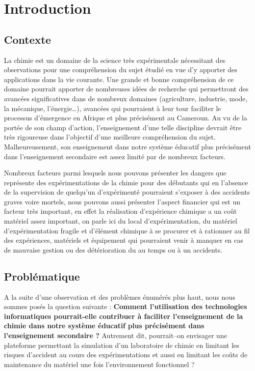 \chapter*{Introduction}         %

\section*{Contexte}

La chimie est un domaine de la science très expérimentale nécessitant des observations pour une compréhension du sujet étudié en vue d’y apporter des applications dans la vie courante. Une grande et bonne compréhension de ce domaine pourrait apporter de nombreuses idées de recherche qui permettront des avancées significatives dans de nombreux domaines (agriculture, industrie, mode, la mécanique, l'énergie…), avancées qui pourraient à leur tour faciliter le processus d'émergence en Afrique et plus précisément au Cameroun. Au vu de la portée de son champ d’action, l'enseignement d’une telle discipline devrait être très rigoureuse dans l’objectif d’une meilleure compréhension du sujet. Malheureusement, son enseignement dans notre système éducatif plus précisément dans l’enseignement secondaire est assez limité par de nombreux facteurs. 

Nombreux facteurs parmi lesquels nous pouvons présenter les dangers que représente des expérimentations de la chimie pour des débutants qui en l’absence de la supervision de quelqu’un d'expérimenté pourraient s’exposer à des accidents graves voire mortels, nous pouvons aussi présenter l’aspect financier qui est un facteur très important, en effet la réalisation d'expérience chimique a un coût matériel assez important, on parle ici du local d'expérimentation, du matériel d'expérimentation fragile et d'élément chimique à se procurer et à rationner au fil des expériences, matériels et équipement qui pourraient venir à manquer en cas de mauvaise gestion ou des détérioration du au temps ou à un accidents. 

\section*{Problématique}

A la suite d’une observation et des problèmes énumérés plus haut, nous nous sommes posés 
la question suivante : \textbf{\og Comment l’utilisation des technologies informatiques pourrait-elle contribuer à faciliter l’enseignement de la chimie dans notre système éducatif plus précisément dans l’enseignement secondaire ? \fg} Autrement dit, pourrait–on envisager une plateforme permettant la simulation d’un laboratoire de chimie en limitant les risques d’accident au cours des expérimentations et aussi en limitant les coûts de maintenance du matériel une fois l'environnement fonctionnel ? 